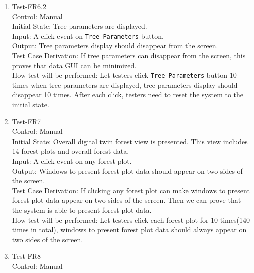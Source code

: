 \documentclass[12pt, titlepage]{article}
\begin{document}
\begin{enumerate}
\item{Test-FR6.2\\}
Control: Manual\\ 

Initial State: Tree parameters are displayed.\\

Input: A click event on \verb|Tree Parameters| button.\\

Output: Tree parameters display should disappear from the screen.\\

Test Case Derivation: If tree parameters can disappear from the 
screen, this proves that data GUI can be minimized.\\
     
How test will be performed: Let testers click 
\verb|Tree Parameters| button 10 times when tree parameters 
are displayed, tree parameters display should disappear 10 times.
After each click, testers need to reset the system to the initial 
state.

\item{Test-FR7\\}
Control: Manual\\ 

Initial State: Overall digital twin forest view is presented. This view includes
14 forest plots and overall forest data.\\

Input: A click event on any forest plot.\\

Output: Windows to present forest plot data should appear on two sides of the 
screen.\\

Test Case Derivation: If clicking any forest plot can make windows to present forest
plot data appear on two sides of the screen. Then we can prove that the system is able
to present forest plot data.\\
					
How test will be performed:  Let testers click each forest plot for 10 times(140 times
in total), windows to present forest plot data should always appear on two sides of
the screen.

\item{Test-FR8\\}
Control: Manual\\ 


\end{enumerate}
\end{document}
